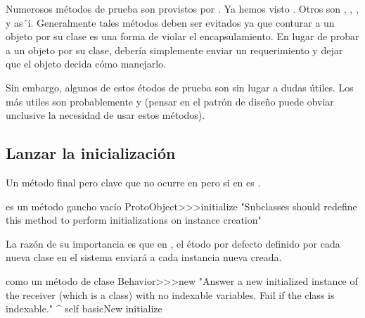 \documentclass[a4paper,10pt,twoside]{book}
\begin{document}
Numerosos m\'etodos de prueba son provistos por . Ya hemos visto . Otros son , , ,  y as´\'i. Generalmente tales m\'etodos deben ser evitados ya que conturar a un objeto por su clase es una forma de violar el encapsulamiento. En lugar de probar a un objeto por su clase, deber\'ia simplemente enviar un requerimiento y dejar que el objeto decida c\'omo manejarlo.

Sin embargo, algunos de estos \'etodos de prueba son sin lugar a dudas \'utiles. Los m\'as utiles son probablemente  y  (pensar en el patr\'on de diseño \cite{Wool98a} puede obviar unclusive la necesidad de usar estos m\'etodos).



\subsection{Lanzar la inicializaci\'on}

Un m\'etodo final pero clave que no ocurre en  pero si en  es .

\begin{method}{ es un m\'etodo gancho vac\'io}
ProtoObject>>>initialize
   "Subclasses should redefine this method to perform initializations on instance creation"
\end{method}

La raz\'on de su importancia es que en \pharo, el \'etodo por defecto  definido por cada nueva clase en el sistema enviar\'a   a cada instancia nueva creada.

\begin{method}{ como un m\'etodo de clase}
Behavior>>>new
    "Answer a new initialized instance of the receiver (which is a class) with no indexable
    variables. Fail if the class is indexable."
    ^ self basicNew initialize
\end{method}
\end{document}
